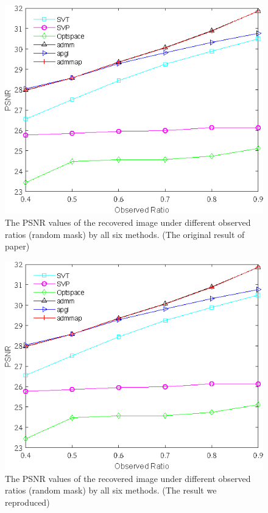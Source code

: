 \documentclass{article}
\begin{document}
{\begin{figure}[ht]
    \centering
    \includegraphics[]{./assets/fig5.eps}
    \caption{The PSNR values of the recovered image under different
        observed ratios (random mask) by all six methods. (The original result of paper)\label{fig5ori}}
\end{figure}
\begin{figure}[ht]
    \centering
    \includegraphics[]{./assets/fig5.eps}
    \caption{The PSNR values of the recovered image under different
        observed ratios (random mask) by all six methods. (The result we reproduced)\label{fig5}}
\end{figure}

}
\end{document}

